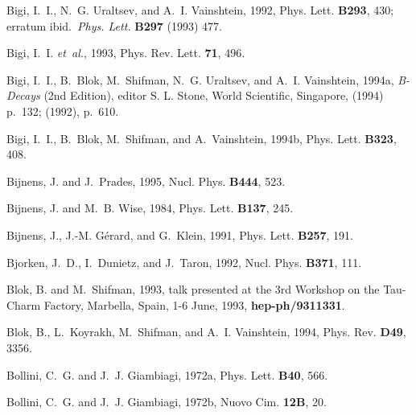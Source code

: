 \begin{thebibliography}{\protect{}1991}
Bigi, I.~I., N.~G. Uraltsev, and A.~I. Vainshtein, 1992,
\newblock Phys. Lett. {\bf B293}, 430; erratum ibid.\ {\em Phys. Lett.} {\bf
  B297} (1993) 477.

Bigi, I.~I. {\em et~al.\/}, 1993,
\newblock Phys. Rev. Lett. {\bf 71}, 496.

Bigi, I.~I., B.~Blok, M.~Shifman, N.~G. Uraltsev, and A.~I. Vainshtein, 1994a,
 {\em B-Decays} {\rm (2nd Edition), editor S. L. Stone, World
  Scientific, Singapore, (1994) p.\ 132; (1992), p.\ 610}.

Bigi, I.~I., B.~Blok, M.~Shifman, and A.~Vainshtein, 1994b,
\newblock Phys. Lett. {\bf B323}, 408.

Bijnens, J. and J.~Prades, 1995,
\newblock Nucl. Phys. {\bf B444}, 523.

Bijnens, J. and M.~B. Wise, 1984,
\newblock Phys. Lett. {\bf B137}, 245.

Bijnens, J., J.-M. G\'{e}rard, and G.~Klein, 1991,
\newblock Phys. Lett. {\bf B257}, 191.

Bjorken, J.~D., I.~Dunietz, and J.~Taron, 1992,
\newblock Nucl. Phys. {\bf B371}, 111.

Blok, B. and M.~Shifman, 1993,
\newblock talk presented at the 3rd Workshop on the Tau-Charm Factory,
  Marbella, Spain, 1-6 June, 1993, {\bf hep-ph/9311331}.

Blok, B., L.~Koyrakh, M.~Shifman, and A.~I. Vainshtein, 1994,
\newblock Phys. Rev. {\bf D49}, 3356.

Bollini, C.~G. and J.~J. Giambiagi, 1972a,
\newblock Phys. Lett. {\bf B40}, 566.

Bollini, C.~G. and J.~J. Giambiagi, 1972b,
\newblock Nuovo Cim. {\bf 12B}, 20.


\end{thebibliography}
